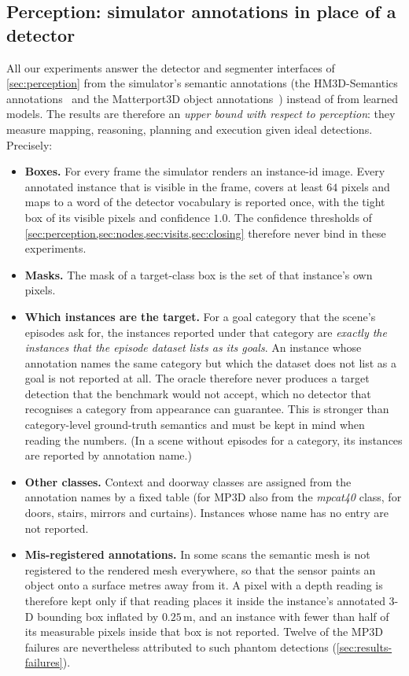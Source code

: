 \documentclass[10pt]{article}
\newcommand{\m}{\,\mathrm{m}}
\begin{document}
\subsection{Perception: simulator annotations in place of a detector}
\label{sec:experiments-oracle}
All our experiments answer the detector and segmenter interfaces of
\cref{sec:perception} from the simulator's semantic annotations (the
HM3D-Semantics annotations~\citep{yadav2023habitat} and the Matterport3D object
annotations~\citep{chang2017matterport3d}) instead of from learned models. The
results are therefore an \emph{upper bound with respect to perception}: they
measure mapping, reasoning, planning and execution given ideal detections.
Precisely:
\begin{itemize}[leftmargin=*,itemsep=2pt,topsep=2pt]
  \item \textbf{Boxes.} For every frame the simulator renders an instance-id
        image. Every annotated instance that is visible in the frame, covers at
        least $64$ pixels and maps to a word of the detector vocabulary is
        reported once, with the tight box of its visible pixels and confidence
        $1.0$. The confidence thresholds of
        \cref{sec:perception,sec:nodes,sec:visits,sec:closing} therefore never
        bind in these experiments.
  \item \textbf{Masks.} The mask of a target-class box is the set of that
        instance's own pixels.
  \item \textbf{Which instances are the target.} For a goal category that the
        scene's episodes ask for, the instances reported under that category
        are \emph{exactly the instances that the episode dataset lists as its
        goals}. An instance whose annotation names the same category but which
        the dataset does not list as a goal is not reported at all. The oracle
        therefore never produces a target detection that the benchmark would
        not accept, which no detector that recognises a category from
        appearance can guarantee. This is stronger than category-level
        ground-truth semantics and must be kept in mind when reading the
        numbers. (In a scene without episodes for a category, its instances
        are reported by annotation name.)
  \item \textbf{Other classes.} Context and doorway classes are assigned from
        the annotation names by a fixed table (for MP3D also from the
        \emph{mpcat40} class, for doors, stairs, mirrors and curtains).
        Instances whose name has no entry are not reported.
  \item \textbf{Mis-registered annotations.} In some scans the semantic mesh
        is not registered to the rendered mesh everywhere, so that the sensor
        paints an object onto a surface metres away from it. A pixel with a
        depth reading is therefore kept only if that reading places it inside
        the
        instance's annotated 3-D bounding box inflated by $0.25\m$, and an
        instance with fewer than half of its measurable pixels inside that box
        is not reported. Twelve of the MP3D failures are nevertheless
        attributed to such phantom detections (\cref{sec:results-failures}).
\end{itemize}
\end{document}
